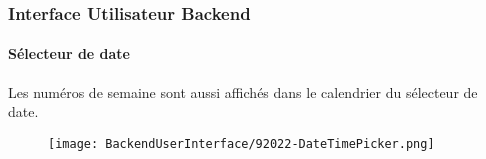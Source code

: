%

\begin{frame}[fragile]
	\frametitle{Interface Utilisateur Backend}
	\framesubtitle{Sélecteur de date}

	Les numéros de semaine sont aussi affichés dans le calendrier du sélecteur de date.

	\begin{figure}
		\texttt{[image: BackendUserInterface/92022-DateTimePicker.png]}
	\end{figure}

\end{frame}

